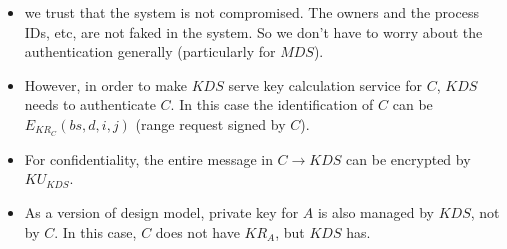 \documentclass[11pt]{article}
\newcommand{\mds}{\ensuremath{\mathit{MDS}}}
\newcommand{\kds}{\ensuremath{\mathit{KDS}}}
\begin{document}
\begin{itemize}
\item we trust that the system is not compromised. The owners and
      the process IDs, etc, are not faked in the system.
      So we don't have to worry about the authentication generally
      (particularly for $\mds$).
\item However, in order to make $\kds$ serve key calculation service for
      $C$, $\kds$ needs to authenticate $C$.
      In this case the identification of $C$
      can be $E_{KR_C}(bs,d,i,j)$ (range request signed by $C$).
\item For confidentiality, the entire message in $C \rightarrow \kds$
      can be encrypted by $KU_{\kds}$.
\item As a version of design model, private key for $A$ is also managed
      by $\kds$, not by $C$. In this case, $C$ does not have $\textit{KR}_A$,
      but $\kds$ has.
\end{itemize}
\end{document}
